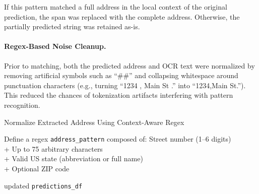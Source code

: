 \documentclass{article}
\begin{document}
If this pattern matched a full address in the local context of the original prediction, the span was replaced with the complete address. Otherwise, the partially predicted string was retained as-is.

\paragraph{Regex-Based Noise Cleanup.}
Prior to matching, both the predicted address and OCR text were normalized by removing artificial symbols such as ``\#\#'' and collapsing whitespace around punctuation characters (e.g., turning ``1234 , Main St .'' into ``1234,Main St.''). This reduced the chances of tokenization artifacts interfering with pattern recognition.

\bigskip
\begin{algorithm}[H]
\caption{Normalize Extracted Address Using Context-Aware Regex}
\label{alg:address_normalization}
\DontPrintSemicolon


\vspace{2mm}
Define a regex \texttt{address\_pattern} composed of:\;
\Indp
Street number (1--6 digits) \\
+ Up to 75 arbitrary characters \\
+ Valid US state (abbreviation or full name) \\
+ Optional ZIP code
\Indm

\vspace{2mm}

\vspace{2mm}
\Return updated \texttt{predictions\_df}
\end{algorithm}
\bigskip
\end{document}
